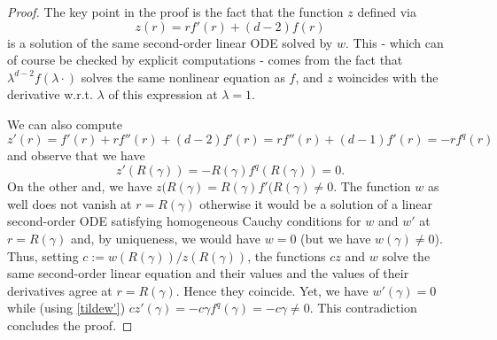 \documentclass[11pt,a4paper]{article}
\numberwithin{equation}{section}
\theoremstyle{plain}
\theoremstyle{remark}
\begin{document}
\begin{proof}
The key point in the proof is the fact that the function $z$ defined via
$$z(r)=rf'(r)+(d-2)f(r)$$
is a solution of the same second-order linear ODE solved by $w$. This - which can of course be checked by explicit computations - comes from the fact that $\lambda^{d-2} f(\lambda\cdot)$ solves the same nonlinear equation as $f$, and $z$ woincides with the derivative w.r.t. $\lambda$ of this expression at $\lambda=1$.

We can also compute
\begin{equation}\label{tildew'}z'(r)=f'(r)+rf''(r)+(d-2)f'(r)=rf''(r)+(d-1)f'(r)=-rf^q(r)
\end{equation}
and observe that we have $$
z'(R(\gamma))=-R(\gamma)f^q(R(\gamma))=0. 
$$
On the other and, we have $z(R(\gamma)=R(\gamma)f'(R(\gamma)\neq 0$. The function $w$ as well does not vanish at $r=R(\gamma)$ otherwise it would be a solution of a linear second-order ODE satisfying homogeneous Cauchy conditions for $w$ and $w'$ at $r=R(\gamma)$ and, by uniqueness, we would have $w=0$ (but we have $w(\gamma)\neq 0$). Thus, setting $c:=w(R(\gamma))/z(R(\gamma))$, the functions $cz$ and $w$ solve the same second-order linear equation and their values and the values of their derivatives agree at $r=R(\gamma)$. Hence they coincide. Yet, we have $w'(\gamma)=0$ while (using \ref{tildew'}) $cz'(\gamma)=-c\gamma f^q(\gamma)=-c\gamma\neq 0$. This contradiction concludes the proof. 

\end{proof}
\end{document}
